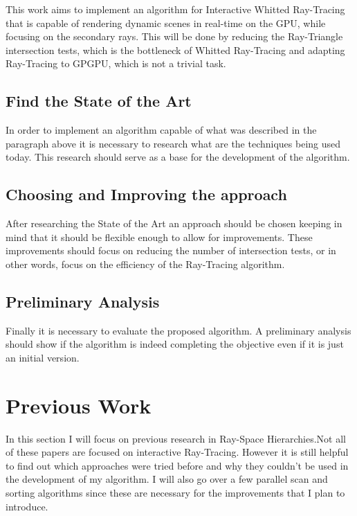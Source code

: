 \documentclass{llncs}
\begin{document}
This work aims to implement an algorithm for Interactive Whitted Ray-Tracing that is capable of rendering dynamic scenes in real-time on the GPU, while focusing on the secondary rays. This will be done by reducing the Ray-Triangle intersection tests, which is the bottleneck of Whitted Ray-Tracing and adapting Ray-Tracing to GPGPU, which is not a trivial task.

%
\subsection{Find the State of the Art}
%

In order to implement an algorithm capable of what was described in the paragraph above it is necessary to research what are the techniques being used today. This research should serve as a base for the development of the algorithm.

%
\subsection{Choosing and Improving the approach}
%

After researching the State of the Art an approach should be chosen keeping in mind that it should be flexible enough to allow for improvements. These improvements should focus on reducing the number of intersection tests, or in other words, focus on the efficiency of the Ray-Tracing algorithm.

%
\subsection{Preliminary Analysis}
%

Finally it is necessary to evaluate the proposed algorithm. A preliminary analysis should show if the algorithm is indeed completing the objective even if it is just an initial version.

%
\section{Previous Work}
%

In this section I will focus on previous research in Ray-Space Hierarchies.Not all of these papers are focused on interactive Ray-Tracing. However it is still helpful to find out which approaches were tried before and why they couldn't be used in the development of my algorithm. I will also go over a few parallel scan and sorting algorithms since these are necessary for the improvements that I plan to introduce.
\end{document}
